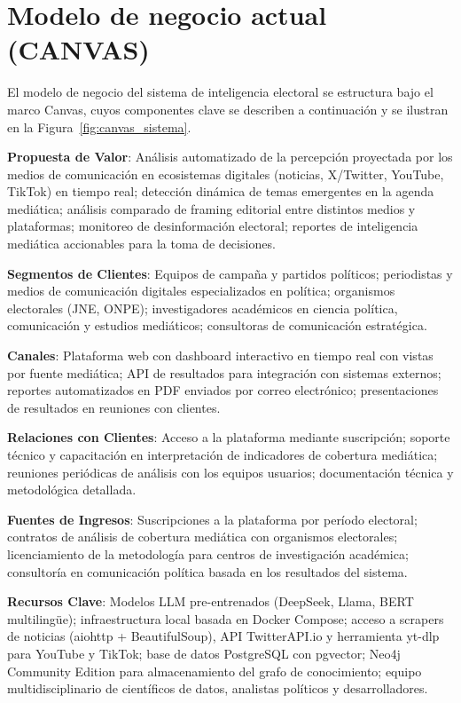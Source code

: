 \section{Modelo de negocio actual (CANVAS)}

El modelo de negocio del sistema de inteligencia electoral se estructura bajo el marco Canvas, cuyos componentes clave se describen a continuación y se ilustran en la Figura~\ref{fig:canvas_sistema}.

\textbf{Propuesta de Valor}: Análisis automatizado de la percepción proyectada por los medios de comunicación en ecosistemas digitales (noticias, X/Twitter, YouTube, TikTok) en tiempo real; detección dinámica de temas emergentes en la agenda mediática; análisis comparado de framing editorial entre distintos medios y plataformas; monitoreo de desinformación electoral; reportes de inteligencia mediática accionables para la toma de decisiones.

\textbf{Segmentos de Clientes}: Equipos de campaña y partidos políticos; periodistas y medios de comunicación digitales especializados en política; organismos electorales (JNE, ONPE); investigadores académicos en ciencia política, comunicación y estudios mediáticos; consultoras de comunicación estratégica.

\textbf{Canales}: Plataforma web con dashboard interactivo en tiempo real con vistas por fuente mediática; API de resultados para integración con sistemas externos; reportes automatizados en PDF enviados por correo electrónico; presentaciones de resultados en reuniones con clientes.

\textbf{Relaciones con Clientes}: Acceso a la plataforma mediante suscripción; soporte técnico y capacitación en interpretación de indicadores de cobertura mediática; reuniones periódicas de análisis con los equipos usuarios; documentación técnica y metodológica detallada.

\textbf{Fuentes de Ingresos}: Suscripciones a la plataforma por período electoral; contratos de análisis de cobertura mediática con organismos electorales; licenciamiento de la metodología para centros de investigación académica; consultoría en comunicación política basada en los resultados del sistema.

\textbf{Recursos Clave}: Modelos LLM pre-entrenados (DeepSeek, Llama, BERT multilingüe); infraestructura local basada en Docker Compose; acceso a scrapers de noticias (aiohttp + BeautifulSoup), API TwitterAPI.io y herramienta yt-dlp para YouTube y TikTok; base de datos PostgreSQL con pgvector; Neo4j Community Edition para almacenamiento del grafo de conocimiento; equipo multidisciplinario de científicos de datos, analistas políticos y desarrolladores.

